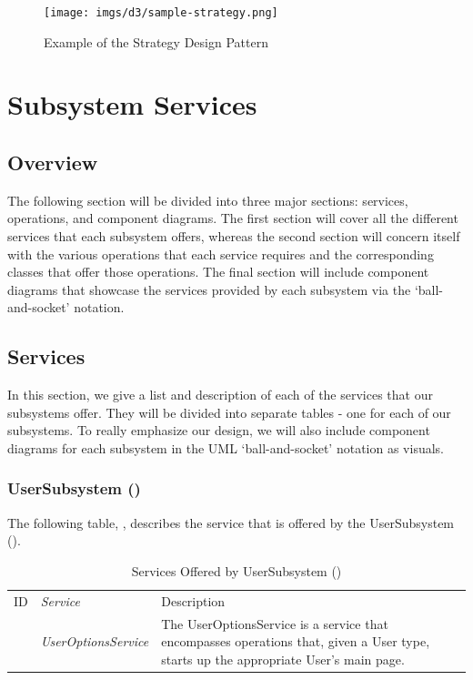 \documentclass[12pt,letterpaper]{article}
\begin{document}
\begin{figure}[H]
	\centering{}
	\texttt{[image: imgs/d3/sample-strategy.png]}
	\caption{Example of the Strategy Design Pattern}
\end{figure}

\section{Subsystem Services}
\subsection{Overview}

The following section will be divided into three major sections: services, operations, and component diagrams. The first section will cover all the different services that each subsystem offers, whereas the second section will concern itself with the various operations that each service requires and the corresponding classes that offer those operations. The final section will include component diagrams that showcase the services provided by each subsystem via the `ball-and-socket' notation.

\subsection{Services}

In this section, we give a list and description of each of the services that our subsystems offer. They will be divided into separate tables - one for each of our subsystems. To really emphasize our design, we will also include component diagrams for each subsystem in the UML `ball-and-socket' notation as visuals.

\newpage{}
\subsubsection{UserSubsystem ()}

\noindent{}
The following table, , describes the service that is offered by the UserSubsystem ().

\begin{table}[H]
	\caption{Services Offered by UserSubsystem ()} 
	\begin{tabu} to 
		\tableheader{}ID & Service & Description\\
		 & UserOptionsService & The UserOptionsService is a service that encompasses operations that, given a User type, starts up the appropriate User's main page.\\
	\end{tabu}
\end{table}
\end{document}
